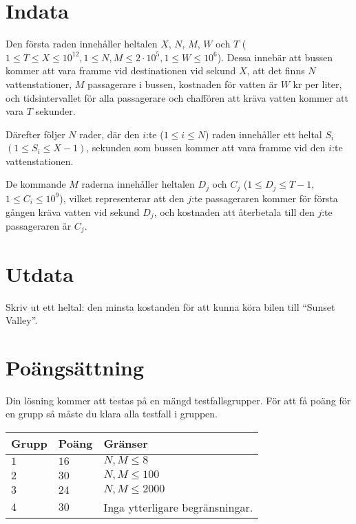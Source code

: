 




\section*{Indata}
Den första raden innehåller heltalen $X$, $N$, $M$, $W$ och $T$ ($1 \leq T \leq X \leq 10^{12}, 1 \leq N,M \leq 2\cdot 10^5, 1 \leq W \leq 10^6$). 
Dessa innebär att bussen kommer att vara framme vid destinationen vid sekund $X$, att det finns $N$ vattenstationer, $M$ passagerare i bussen, kostnaden för vatten är $W$ kr per liter, 
och tidsintervallet för alla passagerare och chaffören att kräva vatten kommer att vara $T$ sekunder.

Därefter följer $N$ rader, där den $i$:te ($1 \leq i \leq N$) raden innehåller ett heltal $S_i$ $(1 \leq S_i \leq X-1)$, sekunden som bussen kommer att
vara framme vid den $i$:te vattenstationen. 

De kommande $M$ raderna innehåller heltalen $D_j$ och $C_j$ ($1 \leq D_j \leq T-1$, $1 \leq C_i \leq 10^9$), vilket representerar
att den $j$:te passageraren kommer för första gången kräva vatten vid sekund $D_j$, och kostnaden att återbetala till den $j$:te passageraren är $C_j$.

\section*{Utdata}
Skriv ut ett heltal: den minsta kostanden för att kunna köra bilen till ``Sunset Valley''.

\section*{Poängsättning}
Din lösning kommer att testas på en mängd testfallsgrupper.
För att få poäng för en grupp så måste du klara alla testfall i gruppen.

\noindent
\begin{tabular}{| l | l | p{12cm} |}
  \hline
  \textbf{Grupp} & \textbf{Poäng} & \textbf{Gränser} \\ \hline
  $1$    & $16$         & $N,M \leq 8$  \\ \hline
  $2$    & $30$         & $N,M \leq 100$ \\ \hline
  $3$    & $24$         & $N,M \leq 2000$ \\ \hline
  $4$    & $30$         & Inga ytterligare begränsningar. \\ \hline
\end{tabular}

